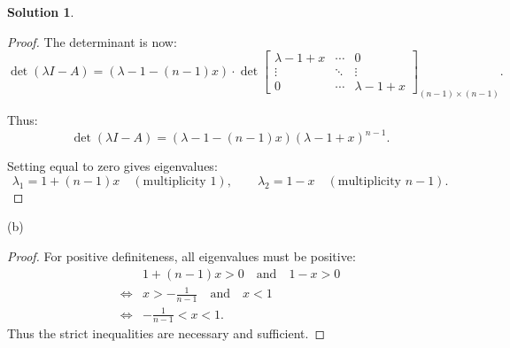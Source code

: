 \documentclass[12pt]{article}
\theoremstyle{definition}
\newtheorem*{solution}{\normalfont\textbf{Solution}}
\begin{document}
\begin{enumerate}[leftmargin=*]
\begin{solution}
\begin{proof}
                    The determinant is now:
                    \[
                    \det(\lambda I - A) = \left( \lambda - 1 - (n-1)x \right) \cdot 
                    \det \begin{bmatrix}
                    \lambda - 1 + x & \cdots & 0 \\
                    \vdots & \ddots & \vdots \\
                    0 & \cdots & \lambda - 1 + x
                    \end{bmatrix}_{(n-1) \times (n-1)}.
                    \]

                    Thus:
                    \[
                    \det(\lambda I - A) = \left( \lambda - 1 - (n-1)x \right) \left( \lambda - 1 + x \right)^{n-1}.
                    \]

                    Setting equal to zero gives eigenvalues:
                    \[
                    \lambda_1 = 1 + (n-1)x \quad (\text{multiplicity } 1), \qquad \lambda_2 = 1 - x \quad (\text{multiplicity } n-1).
                    \]
                    \end{proof}

                \item[(b)]
                    \begin{proof}
                    For positive definiteness, all eigenvalues must be positive:
                    \begin{align*}
                    &1 + (n-1)x > 0 \quad \text{and} \quad 1 - x > 0 \\
                    \iff &x > -\frac{1}{n-1} \quad \text{and} \quad x < 1 \\
                    \iff &-\frac{1}{n-1} < x < 1.
                    \end{align*}
                    Thus the strict inequalities are necessary and sufficient.            
                \end{proof}
            \end{solution}


\end{enumerate}
\end{document}
